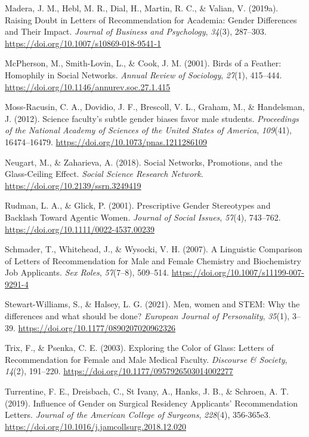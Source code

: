 \documentclass[12pt]{caltech_thesis}
\begin{document}
    Madera, J. M., Hebl, M. R., Dial, H., Martin, R. C., \& Valian, V. (2019a). Raising Doubt in Letters of Recommendation for Academia: Gender Differences and Their Impact. \textit{Journal of Business and Psychology}, \textit{34}(3), 287--303. \url{https://doi.org/10.1007/s10869-018-9541-1}
   
    McPherson, M., Smith-Lovin, L., \& Cook, J. M. (2001). Birds of a Feather: Homophily in Social Networks. \emph{Annual Review of Sociology}, \emph{27}(1), 415--444. \url{https://doi.org/10.1146/annurev.soc.27.1.415}
   
    Moss-Racusin, C. A., Dovidio, J. F., Brescoll, V. L., Graham, M., \& Handelsman, J. (2012). Science faculty's subtle gender biases favor male students. \emph{Proceedings of the National Academy of Sciences of the United States of America}, \emph{109}(41), 16474--16479. \url{https://doi.org/10.1073/pnas.1211286109}
   
    Neugart, M., \& Zaharieva, A. (2018). Social Networks, Promotions, and the Glass-Ceiling Effect. \emph{Social Science Research Network}. \url{https://doi.org/10.2139/ssrn.3249419}
   
    Rudman, L. A., \& Glick, P. (2001). Prescriptive Gender Stereotypes and Backlash Toward Agentic Women. \emph{Journal of Social Issues}, \emph{57}(4), 743--762. \url{https://doi.org/10.1111/0022-4537.00239}
   
    Schmader, T., Whitehead, J., \& Wysocki, V. H. (2007). A Linguistic Comparison of Letters of Recommendation for Male and Female Chemistry and Biochemistry Job Applicants. \emph{Sex Roles}, \emph{57}(7--8), 509--514. \url{https://doi.org/10.1007/s11199-007-9291-4}
   
    Stewart-Williams, S., \& Halsey, L. G. (2021). Men, women and STEM: Why the differences and what should be done? \emph{European Journal of Personality}, \emph{35}(1), 3--39. \url{https://doi.org/10.1177/0890207020962326}
   
    Trix, F., \& Psenka, C. E. (2003). Exploring the Color of Glass: Letters of Recommendation for Female and Male Medical Faculty. \emph{Discourse \& Society}, \emph{14}(2), 191--220. \url{https://doi.org/10.1177/0957926503014002277}
   
    Turrentine, F. E., Dreisbach, C., St Ivany, A., Hanks, J. B., \& Schroen, A. T. (2019). Influence of Gender on Surgical Residency Applicants’ Recommendation Letters. \emph{Journal of the American College of Surgeons}, \emph{228}(4), 356-365e3. \url{https://doi.org/10.1016/j.jamcollsurg.2018.12.020}
\end{document}
